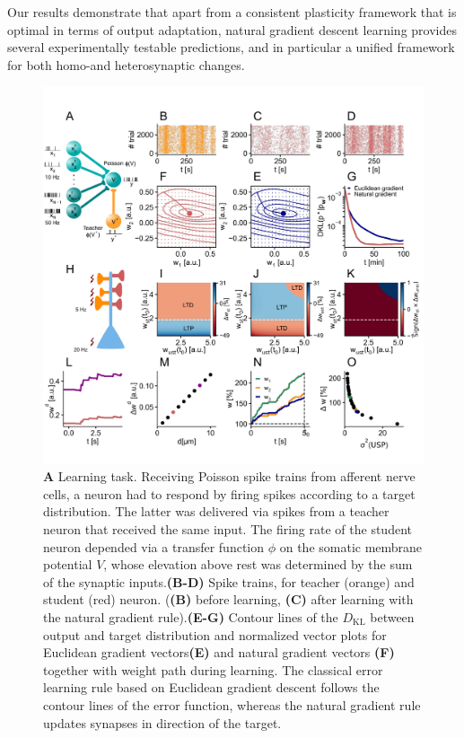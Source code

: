 \documentclass[12pt]{article}
\newcommand{\DKL}{D_\mrm{KL}}
\newcommand{\mrm}{\mathrm}
\begin{document}
Our results demonstrate that apart from a consistent plasticity framework that is optimal in terms of output adaptation, natural gradient descent learning provides several experimentally testable predictions, and in particular a unified framework for both homo-and heterosynaptic changes.
\begin{figure}
\center
\includegraphics[scale=1.0]{Figure_Cosyne2}
\vspace{-0.7cm}
\caption{\footnotesize{\bf A} Learning task. Receiving Poisson spike trains from afferent nerve cells, a neuron had to respond by firing spikes according to a target distribution. The latter was delivered via spikes from a teacher neuron that received the same input. The firing rate of the student neuron depended via a transfer function $\phi$ on the somatic membrane potential $V$, whose elevation above rest was determined by the sum of the synaptic inputs.{\bf(B-D)} Spike trains, for teacher (orange) and student (red) neuron. ({\bf(B)} before learning, {\bf (C)} after learning with the natural gradient rule).{\bf{(E-G)}} Contour lines of the $\DKL$ between output and target distribution and normalized vector plots for Euclidean gradient vectors{\bf(E)} and natural gradient vectors {\bf(F)} together with weight path during learning. The classical error learning rule based on Euclidean gradient descent follows the contour lines of the error function, whereas the natural gradient rule updates synapses in direction of the target.%
}
\end{figure}
\end{document}
